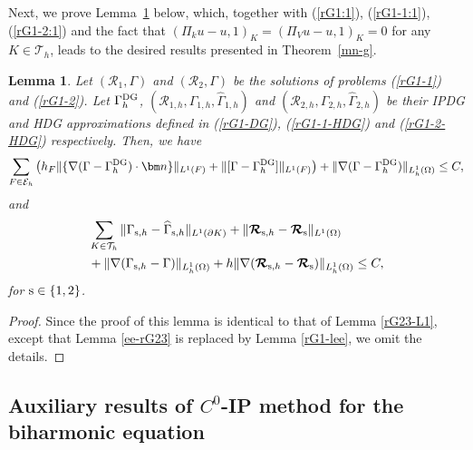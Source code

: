 \documentclass[1996/10/24]{amsart}
\newtheorem{lemma}[theorem]{Lemma}
\theoremstyle{definition}
\numberwithin{equation}{section}
\begin{document}
Next, we prove Lemma~\ref{rG1-L1} below, which, together with (\ref{rG1:1}), (\ref{rG1-1:1}),  (\ref{rG1-2:1}) and the fact that $(\Pi_{k}u-u,1)_{K}=(\Pi_{V}u-u,1)_{K}=0$ for any $K \in \mathcal{T}_{h}$, leads
to the desired results presented in Theorem~\ref{mn-g}.
\begin{lemma}\label{rG1-L1}
Let $(\boldsymbol{\mathcal{R}}_1,\Gamma)$ and $(\boldsymbol{\mathcal{R}}_2,\Gamma)$ be the solutions of problems (\ref{rG1-1}) and (\ref{rG1-2}). Let
$\Gamma_h^{{\rm DG}}$, $(\boldsymbol{\mathcal{R}}_{1,h},\Gamma_{1,h},\widehat{\Gamma}_{1,h})$ and $(\boldsymbol{\mathcal{R}}_{2,h},\Gamma_{2,h},
\widehat{\Gamma}_{2,h})$ be their IPDG and HDG approximations defined in (\ref{rG1-DG}), (\ref{rG1-1-HDG}) and (\ref{rG1-2-HDG}) respectively. Then, we have
\begin{align}
\sum_{F\in\mathcal{E}_h}\left(h_F\|\{\nabla(\Gamma-\Gamma_h^{{\rm DG}})\cdot{\bm n}\}\|_{L^1(F)}+\|[\Gamma-\Gamma_h^{{\rm DG}}]\|_{L^1(F)}\right)
+\|\nabla(\Gamma-\Gamma_h^{{\rm DG}})\|_{L_h^1(\Omega)}\leq C,
\end{align}
and
\begin{align}
&\sum_{K\in\mathcal{T}_h}\|\Gamma_{{\rm s},h}-\widehat{\Gamma}_{{\rm s},h}\|_{L^1(\partial K)}+\|\boldsymbol{\mathcal{R}}_{{\rm s},h}-\boldsymbol{\mathcal{R}}_{\rm s}\|_{L^1(\Omega)}\nonumber\\
&+\|\nabla(\Gamma_{{\rm s},h}-\Gamma)\|_{L_h^1(\Omega)}+h\|\nabla(\boldsymbol{\mathcal{R}}_{{\rm s},h}-\boldsymbol{\mathcal{R}}_{\rm s})\|_{L_h^1(\Omega)}
\leq C,
\end{align}
for ${\rm s\in\{1,2\}}$.
\end{lemma}
\begin{proof}
Since the proof of this lemma is identical to that of Lemma \ref{rG23-L1}, except that Lemma \ref{ee-rG23} is replaced by Lemma \ref{rG1-lee}, we omit the details.
\end{proof}

\subsection{Auxiliary results of $C^{0}$-IP method for the biharmonic equation}
\end{document}
